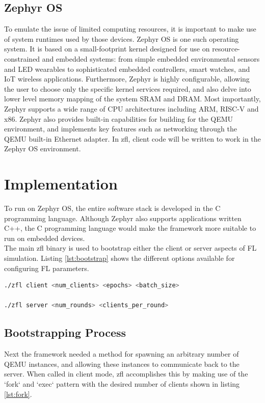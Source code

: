 \documentclass[12pt]{article}
\begin{document}
\subsection{Zephyr OS}
To emulate the issue of limited computing resources, it is important to make use of system runtimes
used by those devices. Zephyr OS\cite{zephyr} is one such operating system. It is based on a small-footprint kernel designed for use on resource-constrained
and embedded systems: from simple embedded environmental sensors and LED wearables to sophisticated embedded controllers, smart watches, and IoT wireless applications.
Furthermore, Zephyr is highly configurable, allowing the user to choose only the specific kernel
services required, and also delve into lower level memory mapping of the system SRAM and DRAM. Most
importantly, Zephyr supports a wide range of CPU architectures including ARM, RISC-V and x86.
Zephyr also provides built-in capabilities for building for the QEMU environment, and implements key
features such as networking through the QEMU built-in Ethernet adapter. In zfl,
client code will be written to work in the Zephyr OS environment.

\section{Implementation}
To run on Zephyr OS, the entire software stack is developed in the C programming language. Although
Zephyr also supports applications written C++, the C programming language would make the framework
more suitable to run on embedded devices. \\

The main zfl binary is used to bootstrap either the client or server aspects of FL simulation.
Listing \ref{lst:bootstrap} shows the different options available for configuring FL parameters.
\begin{lstlisting}[language=bash,caption={The main zfl binary},label={lst:bootstrap}]
./zfl client <num_clients> <epochs> <batch_size>

./zfl server <num_rounds> <clients_per_round>
\end{lstlisting}

\subsection{Bootstrapping Process}
Next the framework needed a method for spawning an arbitrary number of QEMU instances, and allowing
these instances to communicate back to the server. When called in client mode, zfl accomplishes this
by making use of the `fork` and `exec` pattern with the desired number of clients shown in listing \ref{lst:fork}. \\
\end{document}
